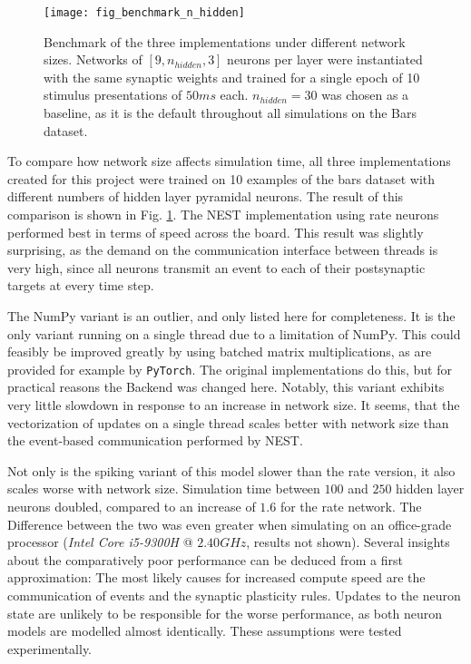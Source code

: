 \begin{figure}[h]
    \centering
    \texttt{[image: fig\_benchmark\_n\_hidden]}
    \caption[Benchmark of the three implementations under different network sizes]{Benchmark of the three
        implementations under different network sizes. Networks of $[9, n_{hidden}, 3]$ neurons per layer  were
        instantiated with the same synaptic weights and trained for a single epoch of 10 stimulus presentations of
        $50ms$ each. $n_{hidden}=30$ was chosen as a baseline, as it is the default throughout all simulations on the
        Bars dataset.}
    \label{fig-benchmark-n-hidden}
\end{figure}


To compare how network size affects simulation time, all three implementations created for this project were trained on
10 examples of the bars dataset with different numbers of hidden layer pyramidal neurons. The result of this comparison
is shown in Fig. \ref{fig-benchmark-n-hidden}.  The NEST implementation using rate neurons performed best in terms of
speed across the board. This result was slightly surprising, as the demand on the communication interface between
threads is very high, since all neurons transmit an event to each of their postsynaptic targets at every time step.

The NumPy variant is an outlier, and only listed here for completeness. It is the only variant running on a single
thread due to a limitation of NumPy. This could feasibly be improved greatly by using batched matrix multiplications, as
are provided for example by \texttt{PyTorch}. The original implementations do this, but for practical reasons the
Backend was changed here. Notably, this variant exhibits very little slowdown in response to an increase in network
size. It seems, that the vectorization of updates on a single thread scales better with network size than the
event-based communication performed by NEST.

Not only is the spiking variant of this model slower than the rate version, it also scales worse with network size.
Simulation time between $100$ and $250$ hidden layer neurons doubled, compared to an increase of $1.6$ for the rate
network. The Difference between the two was even greater when simulating on an office-grade processor (\textit{Intel
    Core i5-9300H} @ $2.40GHz$, results not shown). Several insights about the comparatively poor performance can be deduced
from a first approximation: The most likely causes for increased compute speed are the communication of events and the
synaptic plasticity rules. Updates to the neuron state are unlikely to be responsible for the worse performance, as both
neuron models are modelled almost identically. These assumptions were tested experimentally.



